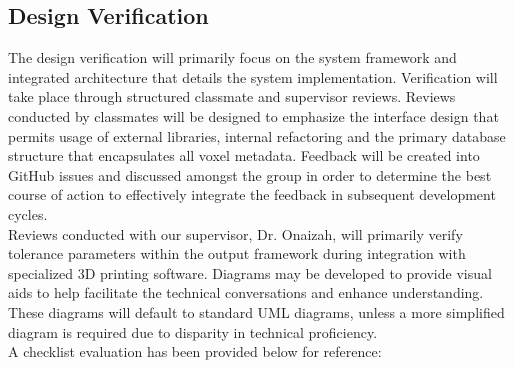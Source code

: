 \documentclass[12pt, titlepage]{article}
\begin{document}

\subsection{Design Verification}

The design verification will primarily focus on the system framework and integrated architecture that details the system implementation. Verification will take place through structured classmate and supervisor reviews. Reviews conducted by classmates will be designed to emphasize the interface design that permits usage of external libraries, internal refactoring and the primary database structure that encapsulates all voxel metadata. Feedback will be created into GitHub issues and discussed amongst the group in order to determine the best course of action to effectively integrate the feedback in subsequent development cycles.\\

\noindent Reviews conducted with our supervisor, Dr. Onaizah, will primarily verify tolerance parameters within the output framework during integration with specialized 3D printing software. Diagrams may be developed to provide visual aids to help facilitate the technical conversations and enhance understanding. These diagrams will default to standard UML diagrams, unless a more simplified diagram is required due to disparity in technical proficiency.\\

\noindent A checklist evaluation has been provided below for reference:\\
\end{document}
